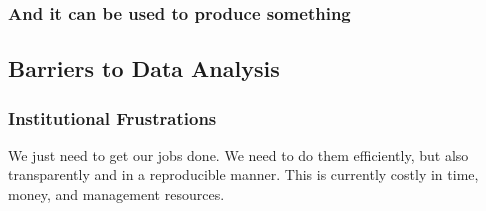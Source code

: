 \documentclass{beamer}
\begin{document}
{
\begin{frame}[plain]
\frametitle{And it can be used to produce something}
\end{frame}
}



\subsection{Barriers to Data Analysis}

\begin{frame}
\frametitle{Institutional Frustrations}
We just need to get our jobs done. We need to do them efficiently, but also transparently and in a reproducible manner. This is currently costly in time, money, and management resources.
\end{frame}

{
\begin{frame}[plain]
\end{frame}
}
\end{document}
